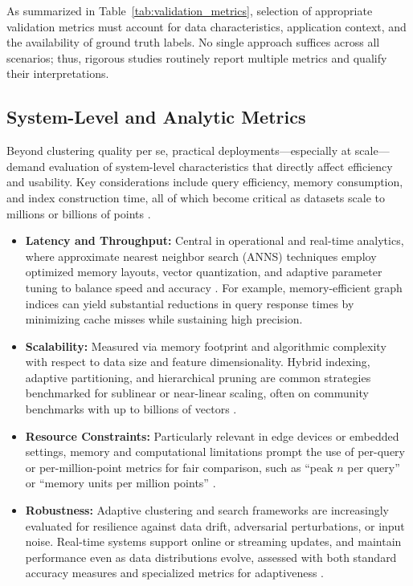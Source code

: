 As summarized in Table~\ref{tab:validation_metrics}, selection of appropriate validation metrics must account for data characteristics, application context, and the availability of ground truth labels. No single approach suffices across all scenarios; thus, rigorous studies routinely report multiple metrics and qualify their interpretations.

\subsection{System-Level and Analytic Metrics}

Beyond clustering quality per se, practical deployments—especially at scale—demand evaluation of system-level characteristics that directly affect efficiency and usability. Key considerations include query efficiency, memory consumption, and index construction time, all of which become critical as datasets scale to millions or billions of points \cite{ref59, ref60, ref64, ref65, ref66, ref67, ref74, ref77, ref78, ref79, ref80, ref81, ref86, ref87, ref106, ref108, ref109, ref110, ref116, ref117, ref118}.

\begin{itemize}
    \item \textbf{Latency and Throughput:} Central in operational and real-time analytics, where approximate nearest neighbor search (ANNS) techniques employ optimized memory layouts, vector quantization, and adaptive parameter tuning to balance speed and accuracy \cite{ref59, ref60, ref109, ref117, ref118}. For example, memory-efficient graph indices can yield substantial reductions in query response times by minimizing cache misses while sustaining high precision.
    \item \textbf{Scalability:} Measured via memory footprint and algorithmic complexity with respect to data size and feature dimensionality. Hybrid indexing, adaptive partitioning, and hierarchical pruning are common strategies benchmarked for sublinear or near-linear scaling, often on community benchmarks with up to billions of vectors \cite{ref59, ref79, ref108, ref116}.
    \item \textbf{Resource Constraints:} Particularly relevant in edge devices or embedded settings, memory and computational limitations prompt the use of per-query or per-million-point metrics for fair comparison, such as ``peak $n$ per query'' or ``memory units per million points'' \cite{ref60, ref79, ref86, ref87}.
    \item \textbf{Robustness:} Adaptive clustering and search frameworks are increasingly evaluated for resilience against data drift, adversarial perturbations, or input noise. Real-time systems support online or streaming updates, and maintain performance even as data distributions evolve, assessed with both standard accuracy measures and specialized metrics for adaptiveness \cite{ref64, ref108, ref110}.
\end{itemize}

